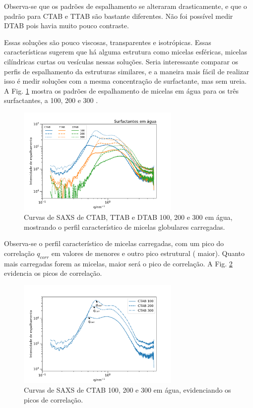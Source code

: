 	Observa-se que os padrões de espalhamento se alteraram drasticamente, e que o padrão para CTAB e TTAB são bastante diferentes. Não foi possível medir DTAB pois havia muito pouco contraste.
	
	Essas soluções são pouco viscosas, transparentes e isotrópicas. Essas características sugerem que há alguma estrutura como micelas esféricas, micelas cilíndricas curtas ou vesículas nessas soluções. Seria interessante comparar os perfis de espalhamento da estruturas similares, e a maneira mais fácil de realizar isso é medir soluções com a mesma concentração de surfactante, mas sem ureia. A Fig. \ref{fig:SAXS_micelas_esfericas} mostra os padrões de espalhamento de micelas em água para os três surfactantes, a 100, 200 e 300 \mM.
	
	\begin{figure}[H]
		\centering
		\includegraphics[width=0.7\textwidth]{imagens/saxs/micelas_esfericas}
		\caption{Curvas de SAXS de CTAB, TTAB e DTAB 100, 200 e 300 \mM{} em água, mostrando o perfil característico de micelas globulares carregadas.}
		\label{fig:SAXS_micelas_esfericas}
	\end{figure}  %
	
	Observa-se o perfil característico de micelas carregadas, com um pico do correlação $q_{corr}$ em valores de \q{} menores e outro pico estrutural (\q{} maior). Quanto mais carregadas forem as micelas, maior será o pico de correlação. A Fig. \ref{fig:SAXS_ctab_q_corrs} evidencia os picos de correlação. 
	
	\begin{figure}[H]
		\centering
		\includegraphics[width=0.7\textwidth]{imagens/saxs/CTAB_q_corrs}
		\caption{Curvas de SAXS de CTAB 100, 200 e 300 \mM{} em água, evidenciando os picos de correlação.}
		\label{fig:SAXS_ctab_q_corrs}
	\end{figure}


